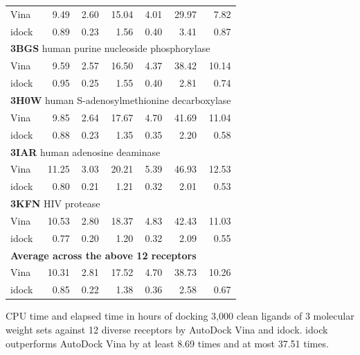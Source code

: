 \documentclass[10pt]{article}
\begin{document}
\begin{table}[!ht]
\begin{tabular}{lrrrrrr}
Vina  &  9.49 &  2.60 & 15.04 &  4.01 & 29.97 &  7.82\\
idock &  0.89 &  0.23 &  1.56 &  0.40 &  3.41 &  0.87\\
\multicolumn{7}{l}{\textbf{3BGS} human purine nucleoside phosphorylase}\\
Vina  &  9.59 &  2.57 & 16.50 &  4.37 & 38.42 & 10.14\\
idock &  0.95 &  0.25 &  1.55 &  0.40 &  2.81 &  0.74\\
\multicolumn{7}{l}{\textbf{3H0W} human S-adenosylmethionine decarboxylase}\\
Vina  &  9.85 &  2.64 & 17.67 &  4.70 & 41.69 & 11.04\\
idock &  0.88 &  0.23 &  1.35 &  0.35 &  2.20 &  0.58\\
\multicolumn{7}{l}{\textbf{3IAR} human adenosine deaminase}\\
Vina  & 11.25 &  3.03 & 20.21 &  5.39 & 46.93 & 12.53\\
idock &  0.80 &  0.21 &  1.21 &  0.32 &  2.01 &  0.53\\
\multicolumn{7}{l}{\textbf{3KFN} HIV protease}\\
Vina  & 10.53 &  2.80 & 18.37 &  4.83 & 42.43 & 11.03\\
idock &  0.77 &  0.20 &  1.20 &  0.32 &  2.09 &  0.55\\
\multicolumn{7}{l}{\textbf{Average across the above 12 receptors}}\\
Vina  & 10.31 &  2.81 & 17.52 &  4.70 & 38.73 & 10.26\\
idock &  0.85 &  0.22 &  1.38 &  0.36 &  2.58 &  0.67\\
\end{tabular}
\begin{flushleft}\label{ExecutionTime} CPU time and elapsed time in hours of docking 3,000 clean ligands of 3 molecular weight sets against 12 diverse receptors by AutoDock Vina and idock. idock outperforms AutoDock Vina by at least 8.69 times and at most 37.51 times.
\end{flushleft}
\end{table}
\end{document}
